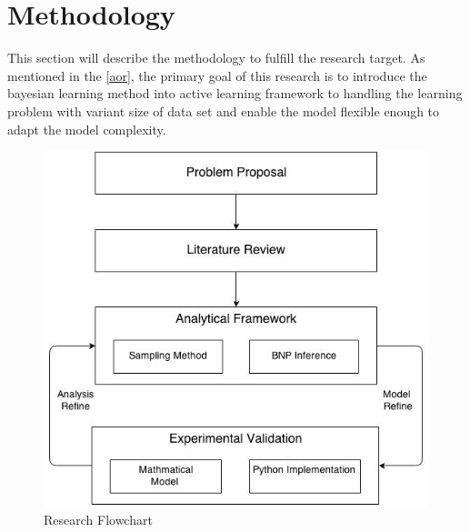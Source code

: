 \section{Methodology}

This section will describe the methodology to fulfill the research target. As mentioned in the \ref{aor}, the primary goal of this research is to introduce the bayesian learning method into active learning framework to handling the learning problem with variant size of data set and enable the model flexible enough to adapt the model complexity. 
\begin{figure}[htbp]
\centering
\includegraphics[width=\linewidth]{proposal}
\caption{Research Flowchart}
\label{fig:proposal}
\end{figure}

